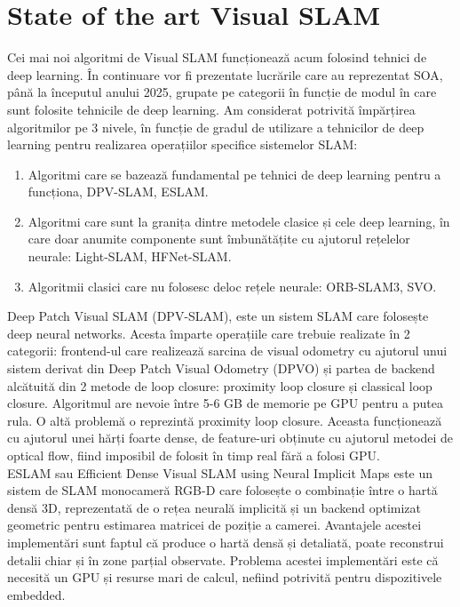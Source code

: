 \documentclass[12pt,a4paper]{report}
\begin{document}
\section{State of the art Visual SLAM}
Cei mai noi algoritmi de Visual SLAM funcționează acum folosind tehnici
de deep learning. În continuare vor fi prezentate lucrările care au reprezentat SOA, până la începutul 
anului 2025, grupate pe categorii în funcție de modul în care sunt folosite tehnicile de deep learning.
Am considerat potrivită împărțirea algoritmilor pe 3 nivele, în funcție de gradul de utilizare 
a tehnicilor de deep learning pentru realizarea operațiilor specifice sistemelor SLAM:\@
\begin{enumerate}
    \item Algoritmi care se bazează fundamental pe tehnici de deep learning pentru a funcționa, 
DPV-SLAM\cite{lipson2024deep}, ESLAM\cite{Wei2024RealTimeDV}.\@
    \item Algoritmi care sunt la granița dintre metodele clasice și cele deep learning, în care 
doar anumite componente sunt îmbunătățite cu ajutorul rețelelor neurale: Light-SLAM\cite{Zhao2024LightSLAMAR}, HFNet-SLAM\cite{Liu2023HFNetSLAMAA}.\@
    \item Algoritmii clasici care nu folosesc deloc rețele neurale: ORB-SLAM3\cite{9440682}, SVO\cite{Forster2014SVOFS}.\@ 
\end{enumerate}   
Deep Patch Visual SLAM (DPV-SLAM), este un sistem SLAM care folosește deep neural networks.
Acesta împarte operațiile care trebuie realizate în 2 categorii: frontend-ul care realizează 
sarcina de visual odometry cu ajutorul unui sistem derivat din Deep Patch Visual Odometry (DPVO)\cite{Teed2022DeepPV}
și partea de backend alcătuită din 2 metode de loop closure: proximity loop closure și classical
loop closure. Algoritmul are nevoie între 5{-}6 GB de memorie pe GPU pentru a putea rula. 
O altă problemă o reprezintă proximity loop closure. Aceasta funcționează cu ajutorul unei hărți
foarte dense, de feature-uri obținute cu ajutorul metodei de optical flow, fiind imposibil de folosit 
în timp real fără a folosi GPU.\@ \\

ESLAM sau Efficient Dense Visual SLAM using Neural Implicit Maps este un sistem de SLAM 
monocameră RGB-D care folosește o combinație între o hartă densă 3D, reprezentată de o rețea 
neurală implicită și un backend optimizat geometric pentru estimarea matricei de poziție a camerei.
Avantajele acestei implementări sunt faptul că produce o hartă densă și detaliată, poate reconstrui 
detalii chiar și în zone parțial observate. Problema acestei implementări este că necesită un 
GPU și resurse mari de calcul, nefiind potrivită pentru dispozitivele embedded. \\
\end{document}
